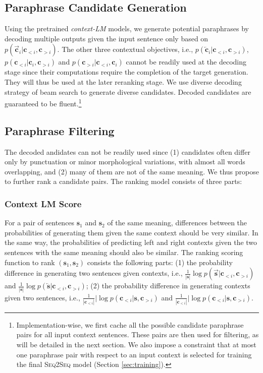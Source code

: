 \documentclass[11pt,a4paper]{article}
\newcommand{\sts}{{{\textsc{Seq2Seq}}}\xspace}
\begin{document}
\subsection{Paraphrase Candidate Generation}
Using the pretrained {\it context-LM} models, we generate potential paraphrases by decoding multiple outputs given the input sentence only based on $p(\overrightarrow{\bm{c}}_i|\bm{c}_{<i},\bm{c}_{>i})$. 
The other three contextual objectives, i.e., $p(\overleftarrow{\bm{c}}_i|\bm{c}_{<i},\bm{c}_{>i})$, $p(\bm{c}_{<i}|\bm{c}_i,\bm{c}_{>i})$ and
  $p(\bm{c}_{>i}|\bm{c}_{<i},\bm{c}_i)$ cannot be readily used at the decoding stage since their computations
 require the completion of the target generation. 
They will thus be used at the later reranking stage. 
We use diverse decoding strategy of beam search \citep{li2016simple} to generate diverse candidates. 
Decoded candidates are guaranteed to be fluent.\footnote{Implementation-wise, we first cache all the possible candidate paraphrase pairs for all input context sentences. These pairs are then used for filtering, as will be detailed in the next section. We also impose a constraint that at most one paraphrase pair with respect to an input context is selected for training the final \sts model (Section \ref{sec:training}).}

\subsection{Paraphrase Filtering}
The decoded andidates can not be readily used since (1)  
 candidates often differ
only by punctuation or minor morphological variations, with almost all words overlapping, and  (2) many of them are not of the same meaning. 
We thus propose to further rank a candidate pairs. The ranking model consists of three parts:
\subsubsection{Context LM Score} 
For a pair of sentences 
$\bm{s}_1$ and $\bm{s}_2$
of the same meaning, differences between  
the probabilities of generating them given the same context should be very similar. 
In the same way, the probabilities of predicting left and right contexts given the two sentences with the same meaning should also be  similar.
The ranking scoring function to rank $(\bm{s}_1, \bm{s}_2)$ consists the following parts:
(1) the probability difference in generating two sentences given contexts, i.e., $ \frac{1}{|\bm{s}|} \log p(\overrightarrow{\bm{s}}| \bm{c}_{<i}, \bm{c}_{>i})$
and $ \frac{1}{|\bm{s}|} \log p(\overleftarrow{\bm{s}}| \bm{c}_{<i}, \bm{c}_{>i})$;
(2) 
the probability difference in generating contexts given two sentences, i.e., $\frac{1}{|\bm{c}_{<i}|} |\log p(\bm{c}_{<i}| \bm{s}, \bm{c}_{>i})$ and 
$\frac{1}{|\bm{c}_{<i}|} |\log p(\bm{c}_{<i}| \bm{s}, \bm{c}_{>i})$. 
\end{document}
